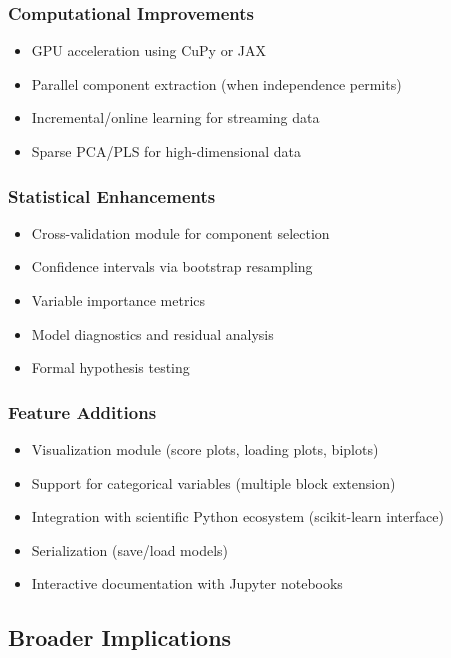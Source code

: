 \documentclass[12pt,a4paper]{article}
\begin{document}
\subsubsection{Computational Improvements}
\begin{itemize}
    \item GPU acceleration using CuPy or JAX
    \item Parallel component extraction (when independence permits)
    \item Incremental/online learning for streaming data
    \item Sparse PCA/PLS for high-dimensional data
\end{itemize}

\subsubsection{Statistical Enhancements}
\begin{itemize}
    \item Cross-validation module for component selection
    \item Confidence intervals via bootstrap resampling
    \item Variable importance metrics
    \item Model diagnostics and residual analysis
    \item Formal hypothesis testing
\end{itemize}

\subsubsection{Feature Additions}
\begin{itemize}
    \item Visualization module (score plots, loading plots, biplots)
    \item Support for categorical variables (multiple block extension)
    \item Integration with scientific Python ecosystem (scikit-learn interface)
    \item Serialization (save/load models)
    \item Interactive documentation with Jupyter notebooks
\end{itemize}

\subsection{Broader Implications}
\end{document}
